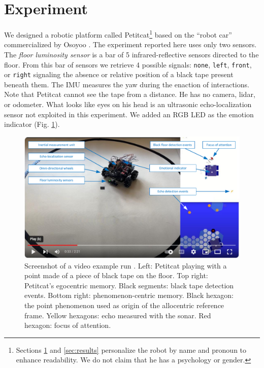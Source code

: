 \documentclass[runningheads]{llncs}
\begin{document}
\section{Experiment}
\label{sec:expe}

We designed a robotic platform called Petitcat\footnote{Sections \ref{sec:expe} and \ref{sec:results} personalize the robot by name and pronoun to enhance readability. We do not claim that he has a psychology or gender.} based on the ``robot car'' commercialized by Osoyoo \cite{osoyoo_robot_car}.
The experiment reported here uses only two sensors.
The \textit{floor luminosity sensor} is a bar of 5 infrared-reflective sensors directed to the floor.
From this bar of sensors we retrieve 4 possible signals:  \texttt{none},  \texttt{left},  \texttt{front}, or \texttt{right} signaling the absence or relative position of a black tape present beneath them.  
The IMU measures the yaw during the enaction of interactions.
Note that Petitcat cannot see the tape from a distance. 
He has no camera, lidar, or odometer.
What looks like eyes on his head is an ultrasonic echo-localization sensor not exploited in this experiment. 
We added an RGB LED as the emotion indicator (Fig. \ref{fig:video}). 

\begin{figure}
	\includegraphics[width=\textwidth]{Figure_video.pdf}
	\caption{Screenshot of a video example run \cite{georgeon_petitcat_2024}.
		Left: Petitcat playing with a point made of a piece of black tape on the floor.
		Top right: Petitcat's egocentric memory. Black segments: black tape detection events. 
		Bottom right: phenomenon-centric memory. 
		Black hexagon: the point phenomenon used as origin of the allocentric reference frame. 
		Yellow hexagons: echo measured with the sonar. Red hexagon: focus of attention.} \label{fig:video}
\end{figure}
\end{document}
